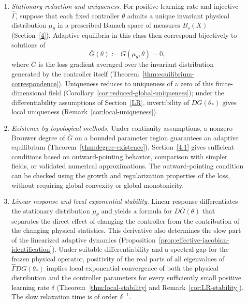 \documentclass[11pt]{article}
\theoremstyle{definition}
\theoremstyle{remark}
\newcommand{\Gammahat}{\widehat{\Gamma}}
\begin{document}
\begin{enumerate}[label=(\roman*)]

  \item \emph{Stationary reduction and uniqueness.}
  For positive learning rate and injective $\Gammahat$,
  suppose that each fixed controller $\theta$ admits a unique
  invariant physical distribution $\mu_\theta$ in a prescribed
  Banach space of measures $B_s(X)$
  (Section~\ref{4}).
  Adaptive equilibria in this class then correspond bijectively
  to solutions of
  \[
    \overline G(\theta):=G(\mu_\theta,\theta)=0,
  \]
  where $\overline G$ is the loss gradient averaged over the
  invariant distribution generated by the controller itself
  (Theorem~\ref{thm:equilibrium-correspondence}).
  Uniqueness reduces to uniqueness of a zero of this
  finite-dimensional field
  (Corollary~\ref{cor:reduced-global-uniqueness});
  under the differentiability assumptions of Section~\ref{LR},
  invertibility of $D\overline G(\theta_*)$ gives local uniqueness
  (Remark~\ref{cor:local-uniqueness}).

  \item \emph{Existence by topological methods.}
  Under continuity assumptions, a nonzero Brouwer degree of
  $\overline G$ on a bounded parameter region guarantees
  an adaptive equilibrium
  (Theorem~\ref{thm:degree-existence}).
  Section~\ref{4.1} gives sufficient conditions based on
  outward-pointing behavior, comparison with simpler fields,
  or validated numerical approximations.
  The outward-pointing condition can be checked using the
  growth and regularization properties of the loss,
  without requiring global convexity or global monotonicity.

  \item \emph{Linear response and local exponential stability.}
  Linear response differentiates the stationary distribution
  $\mu_\theta$ and yields a formula for $D\overline G(\theta)$
  that separates the direct effect of changing the controller
  from the contribution of the changing physical statistics.
  This derivative also determines the slow part of the
  linearized adaptive dynamics
  (Proposition~\ref{prop:effective-jacobian-identification}).
  Under suitable differentiability and a spectral gap for the
  frozen physical operator, positivity of the real parts of all
  eigenvalues of $\Gammahat D\overline G(\theta_*)$ implies
  local exponential convergence of both the physical
  distribution and the controller parameters for every
  sufficiently small positive learning rate $\delta$
  (Theorem~\ref{thm:local-stability} and
  Remark~\ref{cor:LR-stability}).
  The slow relaxation time is of order $\delta^{-1}$.


\end{enumerate}
\end{document}
